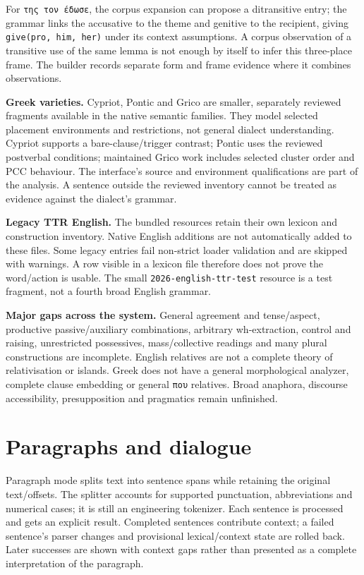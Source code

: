 \documentclass[11pt,a4paper]{article}
\begin{document}
For \texttt{της\ τον\ έδωσε}, the corpus expansion can propose a
ditransitive entry; the grammar links the accusative to the theme and
genitive to the recipient, giving \texttt{give(pro,\ him,\ her)} under
its context assumptions. A corpus observation of a transitive use of the
same lemma is not enough by itself to infer this three-place frame. The
builder records separate form and frame evidence where it combines
observations.

\textbf{Greek varieties.} Cypriot, Pontic and Grico are smaller,
separately reviewed fragments available in the native semantic families.
They model selected placement environments and restrictions, not general
dialect understanding. Cypriot supports a bare-clause/trigger contrast;
Pontic uses the reviewed postverbal conditions; maintained Grico work
includes selected cluster order and PCC behaviour. The interface's
source and environment qualifications are part of the analysis. A
sentence outside the reviewed inventory cannot be treated as evidence
against the dialect's grammar.

\textbf{Legacy TTR English.} The bundled resources retain their own
lexicon and construction inventory. Native English additions are not
automatically added to these files. Some legacy entries fail non-strict
loader validation and are skipped with warnings. A row visible in a
lexicon file therefore does not prove the word/action is usable. The
small \nolinkurl{2026-english-ttr-test} resource is a test fragment, not
a fourth broad English grammar.

\textbf{Major gaps across the system.} General agreement and
tense/aspect, productive passive/auxiliary combinations, arbitrary
wh-extraction, control and raising, unrestricted possessives,
mass/collective readings and many plural constructions are incomplete.
English relatives are not a complete theory of relativisation or
islands. Greek does not have a general morphological analyzer, complete
clause embedding or general \texttt{που} relatives. Broad anaphora,
discourse accessibility, presupposition and pragmatics remain
unfinished.

\section{Paragraphs and dialogue}\label{paragraphs-and-dialogue}

Paragraph mode splits text into sentence spans while retaining the
original text/offsets. The splitter accounts for supported punctuation,
abbreviations and numerical cases; it is still an engineering tokenizer.
Each sentence is processed and gets an explicit result. Completed
sentences contribute context; a failed sentence's parser changes and
provisional lexical/context state are rolled back. Later successes are
shown with context gaps rather than presented as a complete
interpretation of the paragraph.
\end{document}
